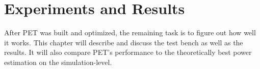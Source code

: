 \chapter{Experiments and Results}

After PET was built and optimized, the remaining task is to figure
out how well it works. This chapter will describe and discuss the test bench as well as
the results. It will also compare PET's performance to the theoretically best power estimation
on the simulation-level.




